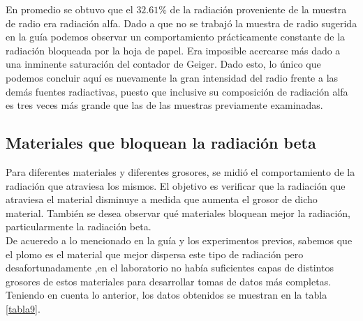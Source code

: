 \documentclass[prb,aps,twocolumn,preprintnumbers,amsmath,amssymb]{revtex4}
\begin{document}
En promedio se obtuvo que el $32.61\%$ de la radiación proveniente de la muestra de radio era radiación alfa. Dado a que no se trabajó la muestra de radio sugerida en la guía \cite{guia} podemos observar un comportamiento prácticamente constante de la radiación bloqueada por la hoja de papel. Era imposible acercarse más dado a una inminente saturación del contador de Geiger. Dado esto, lo único que podemos concluir aquí es nuevamente la gran intensidad del radio frente a las demás fuentes radiactivas, puesto que inclusive su composición de radiación alfa es tres veces más grande que las de las muestras previamente examinadas.

\subsection{Materiales que bloquean la radiación beta}

Para diferentes materiales y diferentes grosores, se midió el comportamiento de la radiación que atraviesa los mismos. El objetivo es verificar que la radiación que atraviesa el material disminuye a medida que aumenta el grosor de dicho material. También se desea observar qué materiales bloquean mejor la radiación, particularmente la radiación beta. \\

De acueredo a lo mencionado en la guía\cite{guia} y los experimentos previos, sabemos que el plomo es el material que mejor dispersa este tipo de radiación pero desafortunadamente ,en el laboratorio no había suficientes capas de distintos grosores de estos materiales para desarrollar tomas de datos más completas. Teniendo en cuenta lo anterior, los datos obtenidos se muestran en la tabla \ref{tabla9}.
\end{document}
